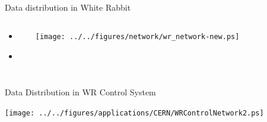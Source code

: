 \documentclass[compress,red]{beamer}
\begin{document}
\subsection{}
\begin{frame}{Data distribution in White Rabbit}


\begin{columns}[c]
 
  \begin{itemize}
    \item \color{gray}{High accuracy/precision synchronization}
    \item \textbf{\color{red}{Deterministic, reliable and low-latency Control Data delivery}}
  \end{itemize}

    \begin{center}
    \texttt{[image: ../../figures/network/wr\_network-new.ps]}
    \end{center}
\end{columns}

\end{frame}
\begin{frame}{Data Distribution in WR Control System}

    \begin{center}
    \texttt{[image: ../../figures/applications/CERN/WRControlNetwork2.ps]}
    \end{center}


\end{frame}
\end{document}

